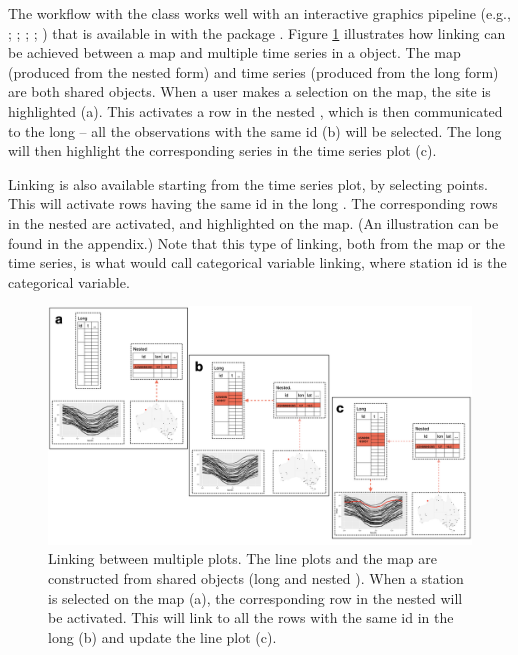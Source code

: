 \documentclass[
  shortnames]{jss}
\begin{document}
The workflow with the  class works well with an interactive graphics pipeline (e.g., \citet{buja1988elements}; \citet{buja1996interactive}; \citet{sutherland2000orca}; \citet{xie2014reactive}; \citet{cheng2016enabling}) that is available in  with the package  \citep{crosstalk}. Figure \ref{fig:illu-interactive} illustrates how linking can be achieved between a map and multiple time series in a  object. The map (produced from the nested form) and time series (produced from the long form) are both shared  objects. When a user makes a selection on the map, the site is highlighted (a). This activates a row in the nested , which is then communicated to the long  -- all the observations with the same id (b) will be selected. The long  will then highlight the corresponding series in the time series plot (c).

Linking is also available starting from the time series plot, by selecting points. This will activate rows having the same id in the long . The corresponding rows in the nested  are activated, and highlighted on the map. (An illustration can be found in the appendix.) Note that this type of linking, both from the map or the time series, is what \citet{CS07} would call categorical variable linking, where station id is the categorical variable.

\begin{CodeChunk}
\begin{figure}

{\centering \includegraphics[width=1\linewidth,height=0.35\textheight]{../figures/diagram-keynotes/diagram-keynotes.004} 

}

\caption{Linking between multiple plots. The line plots and the map are constructed from shared  objects (long and nested ). When a station is selected on the map (a), the corresponding row in the nested  will be activated. This will link to all the rows with the same id in the long  (b) and update the line plot (c).}\label{fig:illu-interactive}
\end{figure}
\end{CodeChunk}
\end{document}
